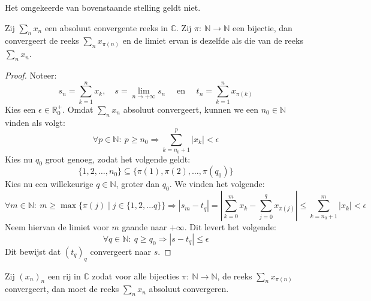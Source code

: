 \documentclass[main.tex]{subfiles}
\begin{document}
\begin{tvb}
  Het omgekeerde van bovenstaande stelling geldt niet.
\end{tvb}

\begin{bst}
  Zij $\sum_{n}x_{n}$ een absoluut convergente reeks in $\mathbb{C}$.
  Zij $\pi:\ \mathbb{N} \rightarrow \mathbb{N}$ een bijectie, dan convergeert de reeks $\sum_{n}x_{\pi(n)}$ en de limiet ervan is dezelfde als die van de reeks $\sum_{n}x_{n}$.

  \begin{proof}
    Noteer:
    \[
    s_{n} = \sum_{k=1}^{n}x_{k},\quad
    s=\lim_{n\rightarrow +\infty}s_{n}\quad
    \text{ en }\quad
    t_{n} = \sum_{k=1}^{n}x_{\pi(k)}
    \]
    Kies een $\epsilon \in \mathbb{R}_{0}^{+}$.
    Omdat $\sum_{n}x_{n}$ absoluut convergeert, kunnen we een $n_{0}\in \mathbb{N}$ vinden als volgt:
    \[ \forall p\in \mathbb{N}:\ p \ge n_{0}\Rightarrow \sum_{k=n_{0}+1}^{p}|x_{k}| < \epsilon \]
    Kies nu $q_{0}$ groot genoeg, zodat het volgende geldt:
    \[ \{ 1,2,\dotsc,n_{0} \} \subseteq \{ \pi(1), \pi(2), \dotsc, \pi(q_{0}) \} \]
    Kies nu een willekeurige $q\in \mathbb{N}$, groter dan $q_{0}$.
    We vinden het volgende:
    \[ \forall m\in \mathbb{N}:\ m\ge \max\{\pi(j)\mid j\in \{1,2,\dotsc q\} \} \Rightarrow |s_{m}-t_{q}| = \left| \sum_{k=0}^{m}x_{k} - \sum_{j=0}^{q}x_{\pi(j)}\right| \le \sum_{k=n_{0}+1}^{m}|x_{k}| < \epsilon \]
    Neem hiervan de limiet voor $m$ gaande naar $+\infty$.
    Dit levert het volgende:
    \[ \forall q\in \mathbb{N}:\ q \ge q_{0} \Rightarrow |s-t_{q}| \le \epsilon \]
    Dit bewijst dat $(t_{q})_{q}$ convergeert naar $s$.
  \end{proof}
\end{bst}

\begin{st}
  Zij $(x_{n})_{n}$ een rij in $\mathbb{C}$ zodat voor alle bijecties $\pi:\ \mathbb{N} \rightarrow \mathbb{N}$, de reeks $\sum_{n}x_{\pi(n)}$ convergeert, dan moet de reeks $\sum_{n}x_{n}$ absoluut convergeren.
\end{st}
\end{document}
